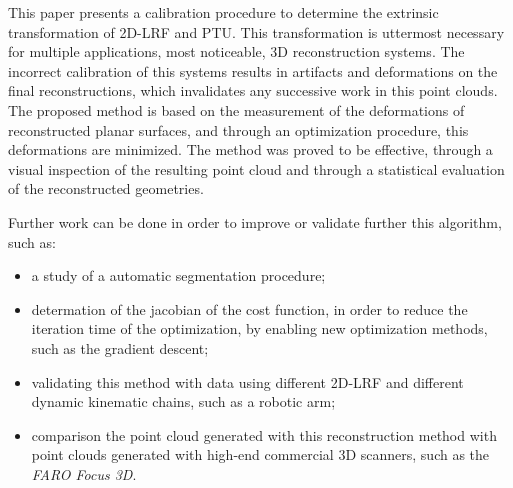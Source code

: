 \documentclass[conference]{IEEEtran}
\begin{document}
This paper presents a calibration procedure to determine the extrinsic transformation of 2D-LRF and PTU. This transformation is uttermost necessary for multiple applications, most noticeable, 3D reconstruction systems. The incorrect calibration of this systems results in artifacts and deformations on the final reconstructions, which invalidates any successive work in this point clouds. The proposed method is based on the measurement of the deformations of reconstructed planar surfaces, and through an optimization procedure, this deformations are minimized. The method was proved to be effective, through a visual inspection of the resulting point cloud and through a statistical evaluation of the reconstructed geometries.

Further work can be done in order to improve or validate further this algorithm, such as:

\begin{itemize}
    \item a study of a automatic segmentation procedure;
    \item determation of the jacobian of the cost function, in order to reduce the iteration time of the optimization, by enabling new optimization methods, such as the gradient descent;
    \item validating this method with data using different 2D-LRF and different dynamic kinematic chains, such as a robotic arm;
    \item comparison the point cloud generated with this reconstruction method with point clouds generated with high-end commercial 3D scanners, such as the \textit{FARO Focus 3D}.
\end{itemize}



\end{document}
